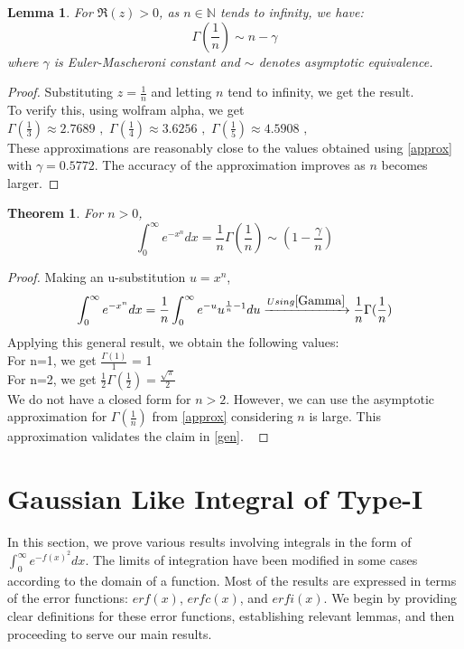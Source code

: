 \documentclass[a4paper,twoside,10pt]{article}
\newtheorem{theorem}{Theorem}[section]
\newtheorem{lemma}{Lemma}[theorem]
\begin{document}
\begin{lemma}
For   $\Re(z)>0  $, as   $n \in \mathbb{N}  $ tends to infinity, we have:
\begin{equation}\label{approx}
 \Gamma \left(\frac{1}{n}\right) \sim n - \gamma   
\end{equation}
where   $\gamma  $ is Euler-Mascheroni constant \cite{Wei2002} and   $\sim  $ denotes asymptotic equivalence.
\end{lemma}
\begin{proof} Substituting $z =  \frac{1}{n}  $ and letting $n$ tend to infinity, we get the result.   $\,\,    $ \\
To verify this, using wolfram alpha, we get \\
   $\Gamma(\frac{1}{3}) \approx 2.7689 \,\, ,  $
  $\Gamma(\frac{1}{4}) \approx 3.6256 \,\, ,  $
  $\Gamma(\frac{1}{5}) \approx 4.5908 \,\, ,  $ \\
These approximations are reasonably close to the values obtained using \eqref{approx} with   $\gamma=0.5772  $. The accuracy of the approximation improves as $n$ becomes larger.
\end{proof}


\begin{theorem}
For   $n>0  $,
\begin{equation}\label{gen}
    \int_0^{\infty} e^{-x^n} dx = \frac{1}{n}\Gamma(\frac{1}{n}) \sim (1-\frac{\gamma}{n}) 
\end{equation}
\end{theorem}
\begin{proof} Making an u-substitution $u = x^n  $,
\[\int_0^{\infty} e^{-x^n} dx = \frac{1}{n}\int_0^{\infty} e^{-u} u^{\frac{1}{n}-1} du \xrightarrow{ Using \eqref{Gamma}} \frac{1}{n}\Gamma(\frac{1}{n}) \]
Applying this general result, we obtain the following values: \\
For n=1, we get   $\frac{\Gamma(1)}{1}  $ = 1 \\
For n=2, we get   $\frac{1}{2}\Gamma(\frac{1}{2}) =\frac{\sqrt{\pi}}{2}   $ \cite{C2016} \\
We do not have a closed form for   $n>2  $. However, we can use the asymptotic approximation for   $\Gamma(\frac{1}{n})$ from \eqref{approx} considering $n$ is large. This approximation validates the claim in \eqref{gen}.  $\,\,    $   
\end{proof}
\section{Gaussian Like Integral of Type-I}
In this section, we prove various results involving integrals in the form of   $\int_0^{\infty}e^{-f(x)^2} dx   $. The limits of integration have been modified in some cases according to the domain of a function. Most of the results are expressed in terms of the error functions: $erf(x)$, $erfc(x)$, and $erfi(x)$. We begin by providing clear definitions for these error functions, establishing relevant lemmas, and then proceeding to serve our main results. \\
\end{document}

